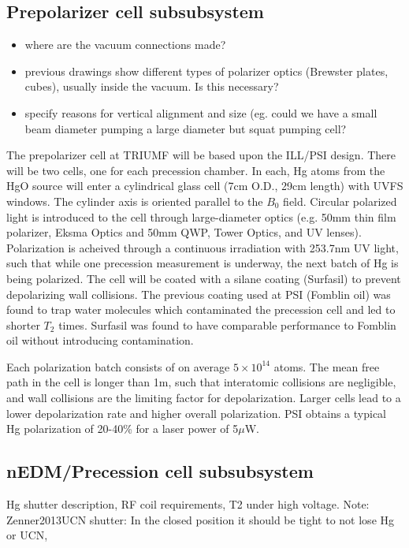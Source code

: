 \documentclass[11pt]{article}
\begin{document}
\subsection{Prepolarizer cell subsubsystem}
\begin{itemize}
\item where are the vacuum connections made?
\item previous drawings show different types of polarizer optics (Brewster plates, cubes), usually inside the vacuum.  Is this necessary?
\item specify reasons for vertical alignment and size (eg. could we have a small beam diameter pumping a large diameter but squat pumping cell?
\end{itemize}

The prepolarizer cell at TRIUMF will be based upon the ILL/PSI design.  There will be two cells, one for each precession chamber.  In each, Hg atoms from the HgO source will enter a cylindrical glass cell (7cm O.D., 29cm length) with UVFS windows.  The cylinder axis is oriented parallel to the $B_0$ field. Circular polarized light is introduced to the cell through large-diameter optics (e.g. 50mm thin film polarizer, Eksma Optics and 50mm QWP, Tower Optics, and UV lenses).  Polarization is acheived through a continuous irradiation with 253.7nm UV light, such that while one precession measurement is underway, the next batch of Hg is being polarized.  The cell will be coated with a silane coating (Surfasil) to prevent depolarizing wall collisions.  The previous coating used at PSI (Fomblin oil) was found to trap water molecules which contaminated the precession cell and led to shorter $T_2$ times.  Surfasil was found to have comparable performance to Fomblin oil without introducing contamination.

Each polarization batch consists of on average $5\times10^{14}$ atoms.  The mean free path in the cell is longer than 1m, such that interatomic collisions are negligible, and wall collisions are the limiting factor for depolarization.  Larger cells lead to a lower depolarization rate and higher overall polarization.  PSI obtains a typical Hg polarization of 20-40\% for a laser power of 5$\mu$W.

\subsection{nEDM/Precession cell subsubsystem}
Hg shutter description, RF coil requirements, T2 under high voltage.
Note: Zenner2013UCN shutter: In the closed position it should be tight to not
lose Hg or UCN,
\end{document}
